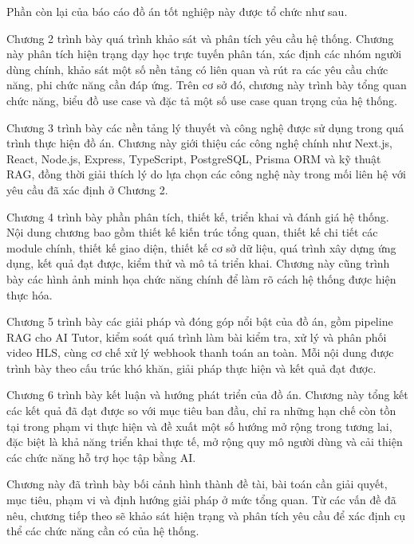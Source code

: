 \documentclass[../DoAn.tex]{subfiles}
\begin{document}
Phần còn lại của báo cáo đồ án tốt nghiệp này được tổ chức như sau.

Chương 2 trình bày quá trình khảo sát và phân tích yêu cầu hệ thống. Chương này phân tích hiện trạng dạy học trực tuyến phân tán, xác định các nhóm người dùng chính, khảo sát một số nền tảng có liên quan và rút ra các yêu cầu chức năng, phi chức năng cần đáp ứng. Trên cơ sở đó, chương này trình bày tổng quan chức năng, biểu đồ use case và đặc tả một số use case quan trọng của hệ thống.

Chương 3 trình bày các nền tảng lý thuyết và công nghệ được sử dụng trong quá trình thực hiện đồ án. Chương này giới thiệu các công nghệ chính như Next.js, React, Node.js, Express, TypeScript, PostgreSQL, Prisma ORM và kỹ thuật RAG, đồng thời giải thích lý do lựa chọn các công nghệ này trong mối liên hệ với yêu cầu đã xác định ở Chương 2.

Chương 4 trình bày phần phân tích, thiết kế, triển khai và đánh giá hệ thống. Nội dung chương bao gồm thiết kế kiến trúc tổng quan, thiết kế chi tiết các module chính, thiết kế giao diện, thiết kế cơ sở dữ liệu, quá trình xây dựng ứng dụng, kết quả đạt được, kiểm thử và mô tả triển khai. Chương này cũng trình bày các hình ảnh minh họa chức năng chính để làm rõ cách hệ thống được hiện thực hóa.

Chương 5 trình bày các giải pháp và đóng góp nổi bật của đồ án, gồm pipeline RAG cho AI Tutor, kiểm soát quá trình làm bài kiểm tra, xử lý và phân phối video HLS, cùng cơ chế xử lý webhook thanh toán an toàn. Mỗi nội dung được trình bày theo cấu trúc khó khăn, giải pháp thực hiện và kết quả đạt được.

Chương 6 trình bày kết luận và hướng phát triển của đồ án. Chương này tổng kết các kết quả đã đạt được so với mục tiêu ban đầu, chỉ ra những hạn chế còn tồn tại trong phạm vi thực hiện và đề xuất một số hướng mở rộng trong tương lai, đặc biệt là khả năng triển khai thực tế, mở rộng quy mô người dùng và cải thiện các chức năng hỗ trợ học tập bằng AI.

Chương này đã trình bày bối cảnh hình thành đề tài, bài toán cần giải quyết, mục tiêu, phạm vi và định hướng giải pháp ở mức tổng quan. Từ các vấn đề đã nêu, chương tiếp theo sẽ khảo sát hiện trạng và phân tích yêu cầu để xác định cụ thể các chức năng cần có của hệ thống.
\end{document}
